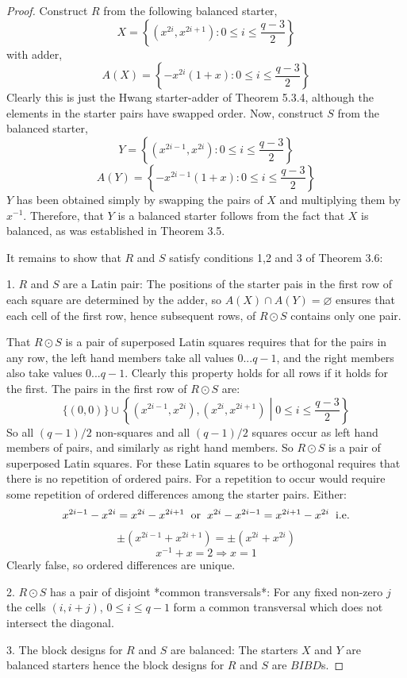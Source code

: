 \documentclass[
  11pt,
  a4paper]{book}
\begin{document}
\begin{proof}
Construct $R$ from the following balanced starter,
$$X = \left \{ (x^{2i},x^{2i+1}):0 \leq i \leq \frac{q-3}{2} \right \}$$
with adder,
$$A(X) = \left \{ -x^{2i}(1+x):0 \leq i \leq \frac{q-3}{2} \right \}$$
Clearly this is just the Hwang starter-adder of Theorem
5.3.4, although the elements in the starter pairs have
swapped order. Now, construct $S$ from the balanced starter,
$$Y = \left \{ (x^{2i-1},x^{2i}):0 \leq i \leq \frac{q-3}{2} \right \}$$
$$A(Y) = \left \{ -x^{2i-1}(1+x):0 \leq i \leq \frac{q-3}{2} \right \}$$
$Y$ has been obtained simply by swapping the pairs of $X$
and multiplying them by $x^{-1}$. Therefore, that $Y$ is a
balanced starter follows from the fact that $X$ is balanced,
as was established in Theorem 3.5.

It remains to show that $R$ and $S$ satisfy conditions 1,2
and 3 of Theorem 3.6:

  1.  $R$ and $S$ are a Latin pair: The positions of the starter pais in
      the first row of each square are determined by the adder, so
      $A(X) \cap A(Y) = \varnothing$ ensures that each cell of the
      first row, hence subsequent rows, of $R \odot S$ contains only one
      pair.
      
      That $R \odot S$ is a pair of superposed Latin squares requires that
      for the pairs in any row, the left hand members take all values
      0...$q-1$, and the right members also take values 0...$q-1$.
      Clearly this property holds for all rows if it holds for the first.
      The pairs in the first row of $R \odot S$ are:
      $$\{(0,0)\} \cup \left \{ (x^{2i-1},x^{2i}),(x^{2i},x^{2i+1}) \middle| 0 \leq i \leq \frac{q-3}{2} \right \}$$
      So all $(q-1)/2$ non-squares and all $(q-1)/2$ squares occur as left
      hand members of pairs, and similarly as right hand members. So
      $R \odot S$ is a pair of superposed Latin squares.
      For these Latin squares to be orthogonal requires that there is no
      repetition of ordered pairs. For a repetition to occur would require
      some repetition of ordered differences among the starter pairs.
      Either:
      $$x^{2i-1} - x^{2i} = x^{2i} - x^{2i+1} \hspace{0.2cm} \mathrm{or} \hspace{0.2cm}
      x^{2i} - x^{2i-1} = x^{2i+1} - x^{2i} \hspace{0.2cm} \mathrm{i.e.}$$
      $$\pm (x^{2i-1} + x^{2i+1}) = \pm (x^{2i} + x^{2i})$$
      $$x^{-1} + x = 2 \Rightarrow x = 1$$ Clearly false, so ordered
      differences are unique.

  2.  $R \odot S$ has a pair of disjoint *common transversals*:
      For any fixed non-zero $j$ the cells $(i,i+j)$, $0 \leq i \leq q-1$
      form a common transversal which does not intersect the diagonal.

  3.  The block designs for $R$ and $S$ are balanced:
      The starters $X$ and $Y$ are balanced starters hence the block
      designs for $R$ and $S$ are $BIBD$s.
\end{proof}
\end{document}

